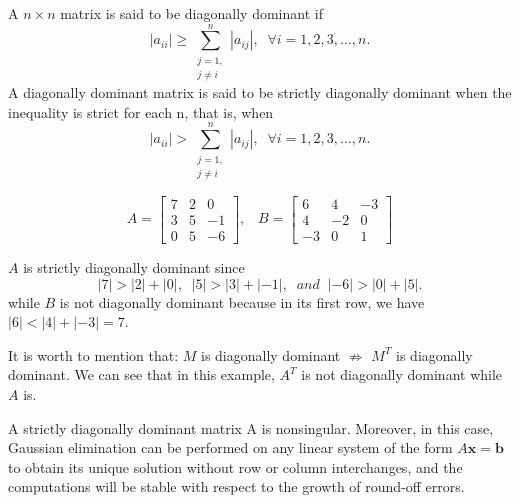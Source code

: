 	\begin{definition}
		A $n\times n$ matrix is said to be diagonally dominant if
		\[ |a_{ii}| \geq \sum_{\substack{j=1,\\ j\neq i}}^n|a_{ij}|,\;\; \forall i = 1,2,3,...,n. \] 
		A diagonally dominant matrix is said to be strictly diagonally dominant when the inequality is strict for each n, that is, when
		\[  |a_{ii}| > \sum_{\substack{j=1,\\ j\neq i}}^n|a_{ij}|,\;\; \forall i = 1,2,3,...,n. \]
	\end{definition}

	\begin{ex}
		\[ A = \begin{bmatrix}
		7 & 2 & 0 \\
		3 & 5 & -1\\ 
		0 & 5 & -6
		\end{bmatrix},\;\;\;
		B =\begin{bmatrix}
		6 & 4  & -3\\ 
		4 & -2 & 0 \\
		-3 & 0 & 1 
		\end{bmatrix}
		 \]
		 
		 $A$ is strictly diagonally dominant since 
		 \[|7| > |2|+|0|,\;\; |5| > |3|+|-1|,\;\; and\;\; |-6| > |0|+|5|. \]  
		 while $B$ is not diagonally dominant because in its first row, we have $|6| < |4|+|-3|= 7$.
		 
		 It is worth to mention that: $M$ is diagonally dominant $\not\Rightarrow$ $M^T$ is diagonally dominant. We can see that in this  example, $A^T$ is not diagonally dominant while $A$ is.
	\end{ex}

	\begin{thm}
		A strictly diagonally dominant matrix A is nonsingular. Moreover, in this case, Gaussian elimination can be performed on any linear system of the form $A\mathbf{x} = \mathbf{b}$ to obtain its unique solution without row or column interchanges, and the computations will be stable with respect to the growth of round-off errors.
	\end{thm}
	
	
